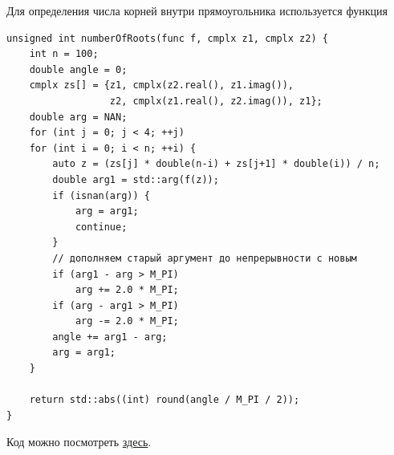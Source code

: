 \documentclass{ncc}
\begin{document}
Для определения числа корней внутри прямоугольника используется функция
\begin{lstlisting}
unsigned int numberOfRoots(func f, cmplx z1, cmplx z2) {
    int n = 100;
    double angle = 0;
    cmplx zs[] = {z1, cmplx(z2.real(), z1.imag()),
                  z2, cmplx(z1.real(), z2.imag()), z1};
    double arg = NAN;
    for (int j = 0; j < 4; ++j)
    for (int i = 0; i < n; ++i) {
        auto z = (zs[j] * double(n-i) + zs[j+1] * double(i)) / n;
        double arg1 = std::arg(f(z));
        if (isnan(arg)) {
            arg = arg1;
            continue;
        }
        // дополняем старый аргумент до непрерывности с новым
        if (arg1 - arg > M_PI)
            arg += 2.0 * M_PI;
        if (arg - arg1 > M_PI)
            arg -= 2.0 * M_PI;
        angle += arg1 - arg;
        arg = arg1;
    }

    return std::abs((int) round(angle / M_PI / 2));
}
\end{lstlisting}

Код можно посмотреть \href{https://github.com/VSTU-physics/complex-roots}{здесь}.
\end{document}
